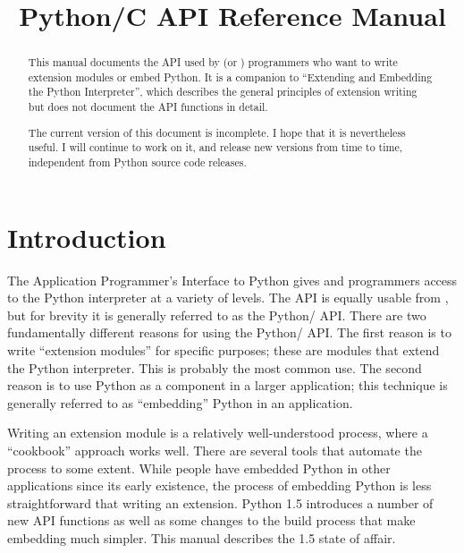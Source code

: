 \documentclass[twoside,openright]{report}
\title{Python/C API Reference Manual}
\begin{document}
\pagestyle{empty}

\maketitle



\begin{abstract}

\noindent
This manual documents the API used by \C{} (or \Cpp{}) programmers who want
to write extension modules or embed Python.  It is a companion to
``Extending and Embedding the Python Interpreter'', which describes
the general principles of extension writing but does not document the
API functions in detail.

 The current version of this document is incomplete.
I hope that it is nevertheless useful.  I will continue to work on it,
and release new versions from time to time, independent from Python
source code releases.

\end{abstract}

\mytableofcontents



\chapter{Introduction}

The Application Programmer's Interface to Python gives \C{} and \Cpp{}
programmers access to the Python interpreter at a variety of levels.
The API is equally usable from \Cpp{}, but for brevity it is generally
referred to as the Python/\C{} API.  There are two fundamentally
different reasons for using the Python/\C{} API.  The first reason is to
write ``extension modules'' for specific purposes; these are \C{} modules
that extend the Python interpreter.  This is probably the most common
use.  The second reason is to use Python as a component in a larger
application; this technique is generally referred to as ``embedding''
Python in an application.

Writing an extension module is a relatively well-understood process, 
where a ``cookbook'' approach works well.  There are several tools 
that automate the process to some extent.  While people have embedded 
Python in other applications since its early existence, the process of 
embedding Python is less straightforward that writing an extension.  
Python 1.5 introduces a number of new API functions as well as some 
changes to the build process that make embedding much simpler.  
This manual describes the 1.5 state of affair.
\end{document}
